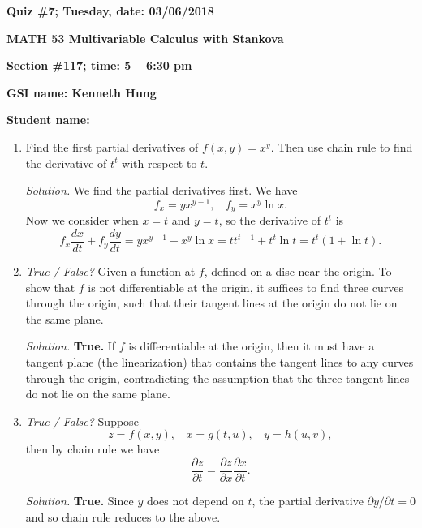 \documentclass{article}
\begin{document}
{\bf Quiz \#7; Tuesday, date: 03/06/2018}

{\bf MATH 53 Multivariable Calculus with Stankova}

{\bf Section \#117; time: 5 -- 6:30 pm}

{\bf GSI name: Kenneth Hung}

{\bf Student name:}

\vspace*{0.25in}

\begin{enumerate}
\item Find the first partial derivatives of $f(x, y) = x^y$. Then use chain rule to find the derivative of $t^t$ with respect to $t$.

{\em Solution.} We find the partial derivatives first. We have
\[
f_x = y x^{y-1}, ~~~~ f_y = x^y \ln x.
\]
Now we consider when $x = t$ and $y = t$, so the derivative of $t^t$ is
\[
f_x \frac{dx}{dt} + f_y \frac{dy}{dt} = yx^{y-1} + x^y \ln x = t t^{t-1} + t^t \ln t = t^t (1 + \ln t).
\]

\item {\em True / False?} Given a function at $f$, defined on a disc near the origin. To show that $f$ is not differentiable at the origin, it suffices to find three curves through the origin, such that their tangent lines at the origin do not lie on the same plane.

{\em Solution.} {\bf True.} If $f$ is differentiable at the origin, then it must have a tangent plane (the linearization) that contains the tangent lines to any curves through the origin, contradicting the assumption that the three tangent lines do not lie on the same plane.

\item {\em True / False?} Suppose
\[
z = f(x, y), ~~~~ x = g(t, u), ~~~~ y = h(u, v),
\]
then by chain rule we have
\[
\frac{\partial z}{\partial t} = \frac{\partial z}{\partial x} \frac{\partial x}{\partial t}.
\]

{\em Solution.} {\bf True.} Since $y$ does not depend on $t$, the partial derivative $\partial y / \partial t = 0$ and so chain rule reduces to the above.
\end{enumerate}
\end{document}
